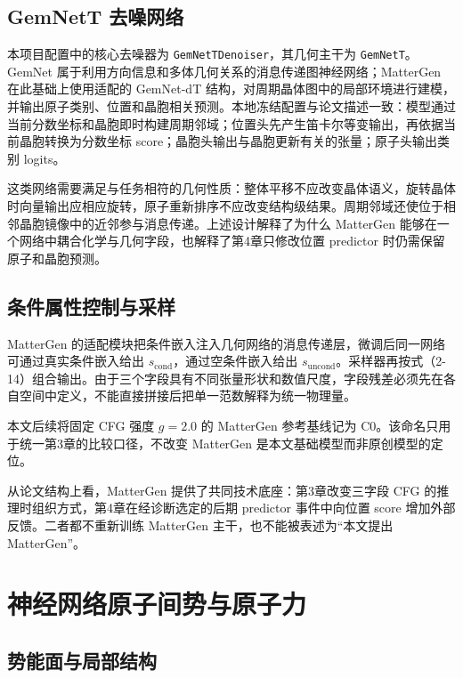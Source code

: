 \subsection{GemNetT 去噪网络}

本项目配置中的核心去噪器为 \texttt{GemNetTDenoiser}，其几何主干为 \texttt{GemNetT}。GemNet 属于利用方向信息和多体几何关系的消息传递图神经网络\citep{gasteiger2021}；MatterGen 在此基础上使用适配的 GemNet-dT 结构，对周期晶体图中的局部环境进行建模，并输出原子类别、位置和晶胞相关预测\citep{zeni2025}。本地冻结配置与论文描述一致：模型通过当前分数坐标和晶胞即时构建周期邻域；位置头先产生笛卡尔等变输出，再依据当前晶胞转换为分数坐标 score；晶胞头输出与晶胞更新有关的张量；原子头输出类别 logits。

这类网络需要满足与任务相符的几何性质：整体平移不应改变晶体语义，旋转晶体时向量输出应相应旋转，原子重新排序不应改变结构级结果。周期邻域还使位于相邻晶胞镜像中的近邻参与消息传递。上述设计解释了为什么 MatterGen 能够在一个网络中耦合化学与几何字段，也解释了第4章只修改位置 predictor 时仍需保留原子和晶胞预测。

\subsection{条件属性控制与采样}

MatterGen 的适配模块把条件嵌入注入几何网络的消息传递层，微调后同一网络可通过真实条件嵌入给出 \(s_{\mathrm{cond}}\)，通过空条件嵌入给出 \(s_{\mathrm{uncond}}\)\citep{zeni2025}。采样器再按式（2-14）组合输出。由于三个字段具有不同张量形状和数值尺度，字段残差必须先在各自空间中定义，不能直接拼接后把单一范数解释为统一物理量。

本文后续将固定 CFG 强度 \(g=2.0\) 的 MatterGen 参考基线记为 C0。该命名只用于统一第3章的比较口径，不改变 MatterGen 是本文基础模型而非原创模型的定位。

从论文结构上看，MatterGen 提供了共同技术底座：第3章改变三字段 CFG 的推理时组织方式，第4章在经诊断选定的后期 predictor 事件中向位置 score 增加外部反馈。二者都不重新训练 MatterGen 主干，也不能被表述为``本文提出 MatterGen''。

\section{神经网络原子间势与原子力}

\subsection{势能面与局部结构}

